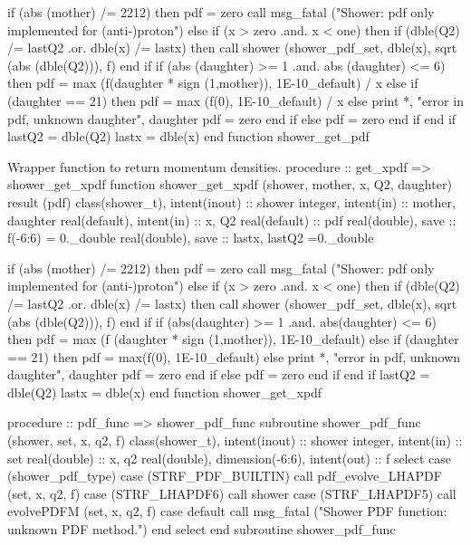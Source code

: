     if (abs (mother) /= 2212) then
       pdf = zero
       call msg_fatal ("Shower: pdf only implemented for (anti-)proton")
    else
       if (x > zero .and. x < one) then
          if (dble(Q2) /= lastQ2 .or. dble(x) /= lastx) then
             call shower%
                  (shower_pdf_set, dble(x), sqrt (abs (dble(Q2))), f)
          end if
          if (abs (daughter) >= 1 .and. abs (daughter) <= 6) then
             pdf = max (f(daughter * sign (1,mother)), 1E-10_default) / x
          else if (daughter == 21) then
             pdf = max (f(0), 1E-10_default) / x
          else
             print *, "error in pdf, unknown daughter", daughter
             pdf = zero
          end if
       else
          pdf = zero
       end if
    end if
    lastQ2 = dble(Q2)
    lastx  = dble(x)
  end function shower_get_pdf

\eatline
\nwendcode{}Wrapper function to return momentum densities. 
\nwenddocs{}\plusendmoddef
  procedure :: get_xpdf => shower_get_xpdf
\nwendcode{}\plusendmoddef
  function shower_get_xpdf (shower, mother, x, Q2, daughter) result (pdf)
    class(shower_t), intent(inout) :: shower
    integer, intent(in) :: mother, daughter
    real(default), intent(in) :: x, Q2
    real(default) :: pdf
    real(double), save :: f(-6:6) = 0._double
    real(double), save :: lastx, lastQ2 =0._double

    if (abs (mother) /= 2212) then
       pdf = zero
       call msg_fatal ("Shower: pdf only implemented for (anti-)proton")
    else
       if (x > zero .and. x < one) then
          if (dble(Q2) /= lastQ2 .or. dble(x) /= lastx) then
             call shower%
                  (shower_pdf_set, dble(x), sqrt (abs (dble(Q2))), f)
          end if
          if (abs(daughter) >= 1 .and. abs(daughter) <= 6) then
             pdf = max (f (daughter * sign (1,mother)), 1E-10_default)
          else if (daughter == 21) then
             pdf = max(f(0), 1E-10_default)
          else
             print *, "error in pdf, unknown daughter", daughter
             pdf = zero
          end if
       else
          pdf = zero
       end if
    end if
    lastQ2 = dble(Q2)
    lastx  = dble(x)
  end function shower_get_xpdf

\eatline
\nwendcode{}\nwdocspar
\nwenddocs{}\plusendmoddef
  procedure :: pdf_func => shower_pdf_func
\nwendcode{}\plusendmoddef
  subroutine shower_pdf_func (shower, set, x, q2, f)
    class(shower_t), intent(inout) :: shower
    integer, intent(in) :: set
    real(double) :: x, q2
    real(double), dimension(-6:6), intent(out) :: f
    select case (shower_pdf_type)
    case (STRF_PDF_BUILTIN) 
       call pdf_evolve_LHAPDF (set, x, q2, f)
    case (STRF_LHAPDF6)
       call shower%
    case (STRF_LHAPDF5)       
       call evolvePDFM (set, x, q2, f)
    case default
       call msg_fatal ("Shower PDF function: unknown PDF method.")   
    end select
  end subroutine shower_pdf_func
\nwendcode{}\nwdocspar
